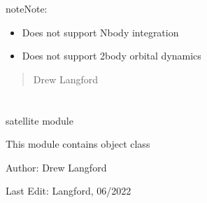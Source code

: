 \documentclass[letterpaper,10pt,english]{sphinxmanual}
\begin{document}
\begin{sphinxadmonition}{note}{Note:}\begin{itemize}
\item {} 
\sphinxAtStartPar
Does not support N\sphinxhyphen{}body integration

\item {} 
\sphinxAtStartPar
Does not support 2\sphinxhyphen{}body orbital dynamics

\end{itemize}
\end{sphinxadmonition}
\begin{quote}\begin{description}
\sphinxAtStartPar
Drew Langford

\sphinxAtStartPar
{}

\end{description}\end{quote}

\sphinxstepscope


\section{}
\label{\detokenize{satellite:module-pyraa.satellite}}\label{\detokenize{satellite:pyraa-satellite-py}}\label{\detokenize{satellite:satellite}}\label{\detokenize{satellite::doc}}
\sphinxAtStartPar
satellite module 

\sphinxAtStartPar
This module contains  object class

\sphinxAtStartPar
Author: Drew Langford

\sphinxAtStartPar
Last Edit: Langford, 06/2022
\end{document}
